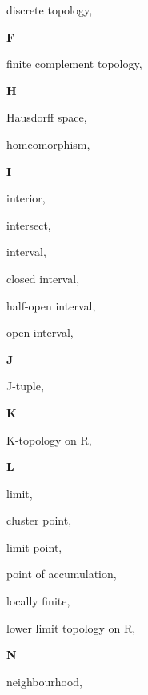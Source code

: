 \begin{multicols}{2}
discrete topology, \pageref{def:DiscreteTopology}

\vspace{1em}\noindent\large{\textbf{F}}

finite complement topology, \pageref{def:FiniteComplementTopology}

\vspace{1em}\noindent\large{\textbf{H}}

Hausdorff space, \pageref{def:HausdorffSpace}

homeomorphism, \pageref{def:Homeomorphism}

\vspace{1em}\noindent\large{\textbf{I}}

interior, \pageref{def:Interior}

intersect, \pageref{def:Intersect}

interval, \pageref{def:Interval}

\hspace{1em}closed interval, \pageref{def:Interval}

\hspace{1em}half-open interval, \pageref{def:Interval}

\hspace{1em}open interval, \pageref{def:Interval}

\vspace{1em}\noindent\large{\textbf{J}}

J-tuple, \pageref{def:JTuple}

\vspace{1em}\noindent\large{\textbf{K}}

K-topology on R, \pageref{def:KTopologyOnTheRealLine}

\vspace{1em}\noindent\large{\textbf{L}}

limit, \pageref{def:Limit}

cluster point, \pageref{def:LimitPoint}

limit point, \pageref{def:LimitPoint}

point of accumulation, \pageref{def:LimitPoint}

locally finite, \pageref{def:LocallyFinite}

lower limit topology on R, \pageref{def:LowerLimitTopologyOnTheRealLine}

\vspace{1em}\noindent\large{\textbf{N}}

neighbourhood, \pageref{def:Neighbourhood}


\end{multicols}
